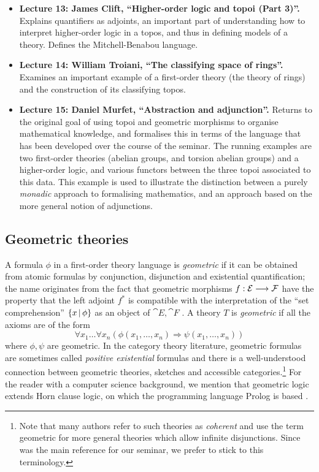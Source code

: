 \documentclass[english,letter paper,12pt,reqno]{article}
\theoremstyle{example}
\begin{document}
\begin{itemize}
\item \textbf{Lecture 13: James Clift, ``Higher-order logic and topoi (Part 3)''.} Explains quantifiers as adjoints, an important part of understanding how to interpret higher-order logic in a topos, and thus in defining models of a theory. Defines the Mitchell-Benabou language.

\item \textbf{Lecture 14: William Troiani, ``The classifying space of rings''.} Examines an important example of a first-order theory (the theory of rings) and the construction of its classifying topos.

\item \textbf{Lecture 15: Daniel Murfet, ``Abstraction and adjunction''.} Returns to the original goal of using topoi and geometric morphisms to organise mathematical knowledge, and formalises this in terms of the language that has been developed over the course of the seminar. The running examples are two first-order theories (abelian groups, and torsion abelian groups) and a higher-order logic, and various functors between the three topoi associated to this data. This example is used to illustrate the distinction between a purely \emph{monadic} approach to formalising mathematics, and an approach based on the more general notion of adjunctions.
\end{itemize}

\subsection{Geometric theories}\label{section:geometric}

A formula $\phi$ in a first-order theory language is \emph{geometric} if it can be obtained from atomic formulas by conjunction, disjunction and existential quantification; the name originates from the fact that geometric morphisms $f: \mathcal{E} \longrightarrow \mathcal{F}$ have the property that the left adjoint $f^*$ is compatible with the interpretation of the ``set comprehension'' $\{ x \,|\, \phi \}$ as an object of $\cat{E}, \cat{F}$ \cite[Theorem X.5]{topos}. A theory $T$ is \emph{geometric} if all the axioms are of the form
\[
\forall x_1 \ldots \forall x_n ( \phi(x_1,\ldots,x_n) \Longrightarrow \psi(x_1,\ldots,x_n) )
\]
where $\phi, \psi$ are geometric. In the category theory literature, geometric formulas are sometimes called \emph{positive existential} formulas \cite[p.45]{makkai} and there is a well-understood connection between geometric theories, sketches and accessible categories.\footnote{Note that many authors refer to such theories as \emph{coherent} and use the term geometric for more general theories which allow infinite disjunctions. Since \cite{topos} was the main reference for our seminar, we prefer to stick to this terminology.} For the reader with a computer science background, we mention that geometric logic extends Horn clause logic, on which the programming language Prolog is based \cite{bezem2}.
\end{document}
